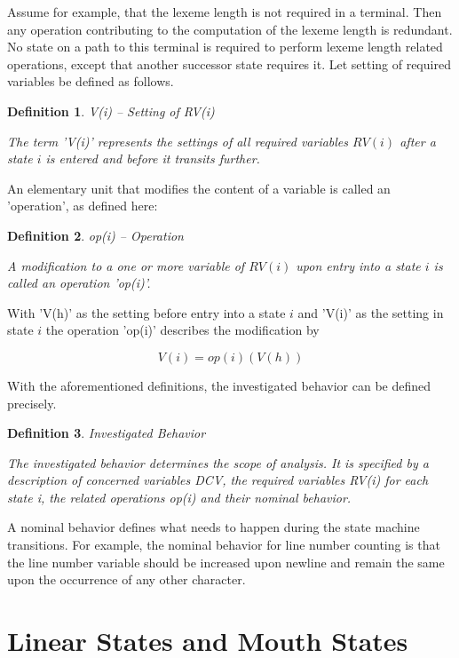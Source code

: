 \documentclass[12pt,a4paper]{scrartcl}
\theoremstyle{break}
\newtheorem{definition}{Definition}
\begin{document}
Assume for example, that the lexeme length is not required in a terminal. Then
any operation contributing to the computation of the lexeme length is
redundant.  No state on a path to this terminal is required to perform lexeme
length related operations, except that another successor state requires it.
Let setting of required variables be defined as follows.

\begin{definition}
V(i) -- Setting of RV(i)

The term 'V(i)' represents the settings of all required variables $RV(i)$
after a state $i$ is entered and before it transits further. 
\end{definition}
    
An elementary unit that modifies the content of a variable is called an
'operation', as defined here:

\begin{definition}
op(i) -- Operation 

A modification to a one or more variable of $RV(i)$ upon entry into a state
$i$ is called an operation 'op(i)'. 
\end{definition}
    
With 'V(h)' as the setting before entry into a state $i$ and 'V(i)' as the
setting in state $i$ the operation 'op(i)' describes the modification by 

\[
                         V(i) = op(i)(V(h))
\]

With the aforementioned definitions, the investigated behavior can be defined
precisely.

\begin{definition}
Investigated Behavior 

The investigated behavior determines the scope of analysis. It is
specified by a description of concerned variables DCV, the required
variables RV(i) for each state i, the related operations op(i) and
their nominal behavior.
\end{definition}
    
A nominal behavior defines what needs to happen during the state machine
transitions.  For example, the nominal behavior for line number counting is
that the line number variable should be increased upon newline and remain the
same upon the occurrence of any other character. 

%
\section{Linear States and Mouth States}
\end{document}
